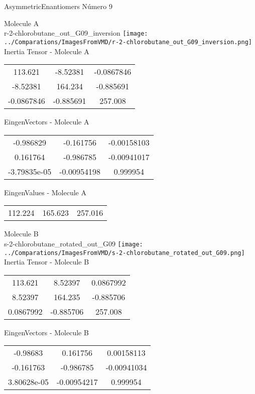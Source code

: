 \vtab[-2cm]
\begin{center}
{\large AsymmetricEnantiomers \tab Número 9}
\end{center}
\begin{multicols}{2}
\begin{center}

Molecule A \\ 
r-2-chlorobutane\_out\_G09\_inversion
\texttt{[image: ../Comparations/ImagesFromVMD/r-2-chlorobutane\_out\_G09\_inversion.png]}
\\
Inertia Tensor - Molecule A \\
\vtab

\begin{tabular}{|c c c|}
113.621	 & 	-8.52381	 & 	-0.0867846	 \\
-8.52381	 & 	164.234	 & 	-0.885691	 \\
-0.0867846	 & 	-0.885691	 & 	257.008
\end{tabular}

\vtab
 EingenVectors - Molecule A     \\
\vtab
\begin{tabular}{|c c c|}
-0.986829	 & 	-0.161756	 & 	-0.00158103	 \\
0.161764	 & 	-0.986785	 & 	-0.00941017	 \\
-3.79835e-05	 & 	-0.00954198	 & 	0.999954
\end{tabular}

\vtab
 EingenValues - Molecule A     \\
\vtab
\begin{tabular}{|c c c|}
112.224	 & 	165.623	 & 	257.016	 \\
\end{tabular}
\columnbreak

Molecule B \\ 
s-2-chlorobutane\_rotated\_out\_G09
\texttt{[image: ../Comparations/ImagesFromVMD/s-2-chlorobutane\_rotated\_out\_G09.png]}
\\
Inertia Tensor - Molecule B \\
\vtab

\begin{tabular}{|c c c|}
113.621	 & 	8.52397	 & 	0.0867992	 \\
8.52397	 & 	164.235	 & 	-0.885706	 \\
0.0867992	 & 	-0.885706	 & 	257.008
\end{tabular}

\vtab
 EingenVectors - Molecule B     \\
\vtab
\begin{tabular}{|c c c|}
-0.98683	 & 	0.161756	 & 	0.00158113	 \\
-0.161763	 & 	-0.986785	 & 	-0.00941034	 \\
3.80628e-05	 & 	-0.00954217	 & 	0.999954
\end{tabular}


\end{center}
\end{multicols}
